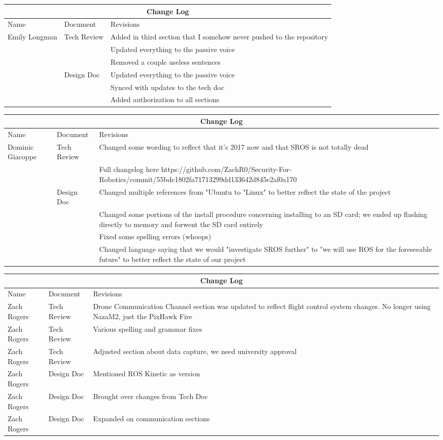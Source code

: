 \documentclass[IEEEtran,letterpaper,10pt,titlepage,draftclsnofoot,onecolumn]{article}
\begin{document}
\begin{tabular}{ |p{3cm}|p{3cm}|p{3cm}|  }
\hline
\multicolumn{3}{|c|}{Change Log} \\
\hline
Name & Document & Revisions \\
\hline
Emily Longman & Tech Review & Added in third section that I somehow never pushed to the repository \\
& & Updated everything to the passive voice \\
& & Removed a couple useless sentences\\
& Design Doc & Updated everything to the passive voice \\
& & Synced with updates to the tech doc\\
& & Added authorization to all sections\\
\hline
\end{tabular}

\begin{tabular}{ |p{3cm}|p{3cm}|p{3cm}|  }
\hline
\multicolumn{3}{|c|}{Change Log} \\
\hline
Name & Document & Revisions \\
\hline
Dominic Giacoppe & Tech Review & Changed some wording to reflect that it's 2017 now and that SROS is not totally dead \\
& & Full changelog here https://github.com/ZachR0/Security-For-Robotics/commit/55bdc1802fa71713299dd133642d845e2af0a170 \\
& Design Doc & Changed multiple references from "Ubuntu to "Linux" to better reflect the state of the project \\
& & Changed some portions of the install procedure concerning installing to an SD card; we ended up flashing directly to memory and forwent the SD card entirely \\
& & Fixed some spelling errors (whoops) \\
& & Changed language saying that we would "investigate SROS further" to "we will use ROS for the foreseeable future" to better reflect the state of our project \\
\hline
\end{tabular}

\begin{tabular}{ |p{3cm}|p{3cm}|p{3cm}|  }
\hline
\multicolumn{3}{|c|}{Change Log} \\
\hline
Name & Document & Revisions \\
\hline
Zach Rogers & Tech Review & Drone Communication Channel section was updated to reflect flight control system changes. No longer using NazaM2, just the PixHawk Fire \\
Zach Rogers & Tech Review & Various spelling and grammar fixes \\
Zach Rogers & Tech Review & Adjusted section about data capture, we need university approval \\
Zach Rogers & Design Doc & Mentioned ROS Kinetic as version \\
Zach Rogers & Design Doc & Brought over changes from Tech Doc \\
Zach Rogers & Design Doc & Expanded on communication sections \\
\hline
\end{tabular}
\end{document}
